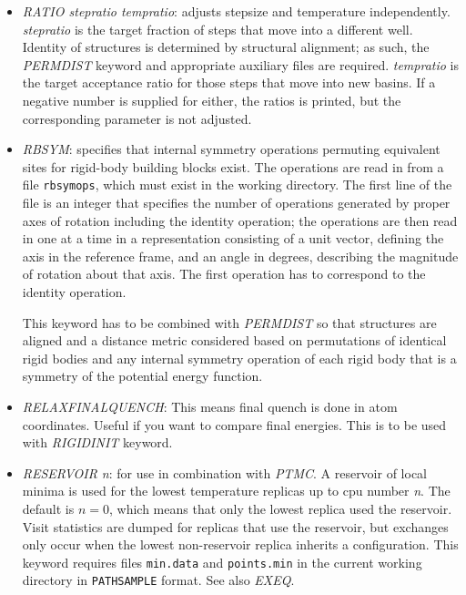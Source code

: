 \documentclass[12pt,a4paper,dvips]{article}
\begin{document}
\begin{itemize}
\item {\it RATIO stepratio tempratio\/}: adjusts stepsize and temperature independently.
{\it stepratio} is the target fraction of steps that move into a different well. Identity of
structures is determined by structural alignment; as such, the {\it PERMDIST} keyword and
appropriate auxiliary files are required. {\it tempratio} is the target acceptance ratio for
those steps that move into new basins. If a negative number is supplied for either, the
ratios is printed, but the corresponding parameter is not adjusted.

\item {\it RBSYM\/}: specifies that internal symmetry operations permuting equivalent sites for
rigid-body building blocks exist. The operations are read in from a file {\tt rbsymops}, which must
exist in the working directory. The first line of the file is an integer that specifies the number
of operations generated by proper axes of rotation including the identity operation; the operations
are then read in one at a time in a representation consisting of a unit vector, defining the
axis in the reference frame, and an angle in degrees, describing the magnitude of rotation about
that axis. The first operation has to correspond to the identity operation.

This keyword has to be combined with {\it PERMDIST\/} so that structures are aligned and
a distance metric considered based on permutations of identical rigid
bodies and any internal symmetry operation of each rigid body that is a symmetry
of the potential energy function.



\item {\it RELAXFINALQUENCH\/}: This means final quench is done in atom coordinates. Useful if you want to compare final energies. This is to be used with {\it RIGIDINIT\/} keyword.

\item {\it RESERVOIR n\/}: for use in combination with {\it PTMC}. A reservoir of local minima
is used for the lowest temperature replicas up to cpu number {\it n}. The default is
$n=0$, which means that only the lowest replica used the reservoir. Visit statistics are
dumped for replicas that use the reservoir, but exchanges only occur when the lowest
non-reservoir replica inherits a configuration. This keyword requires files
{\tt min.data} and {\tt points.min} in the current working directory in {\tt PATHSAMPLE}
format. See also {\it EXEQ\/}.


\end{itemize}
\end{document}
